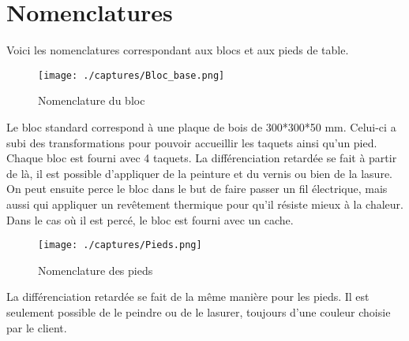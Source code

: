 \section{Nomenclatures}

Voici les nomenclatures correspondant aux blocs et aux pieds de table.

	\begin{figure}[H]
\centering
\texttt{[image: ./captures/Bloc\_base.png]}
\caption{Nomenclature du bloc}
	\end{figure}	

Le bloc standard correspond à une plaque de bois de 300*300*50 mm. Celui-ci a subi des transformations pour pouvoir accueillir les taquets ainsi qu'un pied. 
Chaque bloc est fourni avec 4 taquets. 
La différenciation retardée se fait à partir de là, il est possible d'appliquer de la peinture et du vernis ou bien de la lasure. On peut ensuite perce le bloc dans le but de faire passer un fil électrique, mais aussi qui appliquer un revêtement thermique pour qu'il résiste mieux à la chaleur. 
Dans le cas où il est percé, le bloc est fourni avec un cache.
	
		\begin{figure}[H]
\centering
\texttt{[image: ./captures/Pieds.png]}
\caption{Nomenclature des pieds}
	\end{figure}	

La différenciation retardée se fait de la même manière pour les pieds. Il est seulement possible de le peindre ou de le lasurer, toujours d'une couleur choisie par le client.